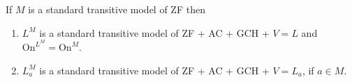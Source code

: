 If $M$ is a standard transitive model of ZF then
\begin{enumerate}
\item $L^M$ is a standard transitive model of ZF + AC + GCH + $V = L$ and $\mathrm{On}^{L^M} = \mathrm{On}^M$.
\item $L_a^M$ is a standard transitive model of ZF + AC + GCH + $V = L_a$, if $a \in M$.
\end{enumerate}

